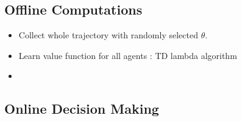 \subsection{Offline Computations }
\begin{itemize}
    \item Collect whole trajectory with randomly selected \(\theta\). 
    \item Learn value function for all agents : TD lambda algorithm 
    \item 
\end{itemize}
\subsection{Online Decision Making}